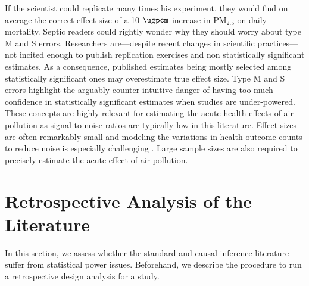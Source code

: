 \documentclass[12pt]{article}
\begin{document}
    If the scientist could replicate many times his experiment, they would find on average the correct effect size of a 10 $\si{\ugpcm}$ increase in PM$_{2.5}$ on daily mortality. Septic readers could rightly wonder why they should worry about type M and S errors. Researchers are---despite recent changes in scientific practices---not incited enough to publish replication exercises and non statistically significant estimates. As a consequence, published estimates being mostly selected among statistically significant ones may overestimate true effect size. Type M and S errors highlight the arguably counter-intuitive danger of having too much confidence in statistically significant estimates when studies are under-powered. These concepts are highly relevant for estimating the acute health effects of air pollution as signal to noise ratios are typically low in this literature. Effect sizes are often remarkably small and modeling the variations in health outcome counts to reduce noise is especially challenging \citep{black_effect_2019}. Large sample sizes are also required to precisely estimate the acute effect of air pollution. 
    
    



\section{Retrospective Analysis of the Literature}
    
    In this section, we assess whether the standard and causal inference literature suffer from statistical power issues. Beforehand, we describe the procedure to run a retrospective design analysis for a study. 
    
\end{document}
